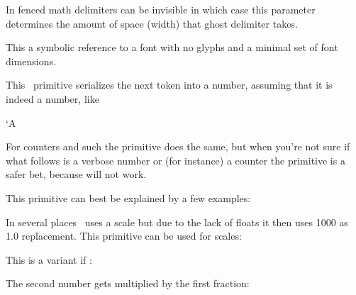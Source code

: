 In fenced math delimiters can be invisible in which case this parameter
determines the amount of space (width) that ghost delimiter takes.

\stopoldprimitive

\startoldprimitive[title={\prm {nullfont}}]

This a symbolic reference to a font with no glyphs and a minimal set of font
dimensions.

\stopoldprimitive

\startoldprimitive[title={\prm {number}}]

This \TEX\ primitive serializes the next token into a number, assuming that it
is indeed a number, like

\starttyping
\number`A
\number\scratchcounter
\stoptyping

For counters and such the  primitive does the same, but when you're
not sure if what follows is a verbose number or (for instance) a counter the
 primitive is a safer bet, because  will not work.

\stopoldprimitive

\startnewprimitive[title={\prm {numericscale}}]

This primitive can best be explained by a few examples:

\startbuffer
\the{}
\the{}
\the{}
\the{}
\stopbuffer

\typebuffer

In several places \TEX\ uses a scale but due to the lack of floats it then uses
1000 as 1.0 replacement. This primitive can be used for  scales:

\startlines \getbuffer \stoplines

\stopnewprimitive

\startnewprimitive[title={\prm {numericscaled}}]

This is a variant if :

\startbuffer
{}
\the{}   \scratchcounter
\the{} \scratchcounter
\the{}  \scratchcounter
\the{}  \scratchcounter
\stopbuffer

\typebuffer

The second number gets multiplied by the first fraction:

\startlines \getbuffer \stoplines

\stopnewprimitive

